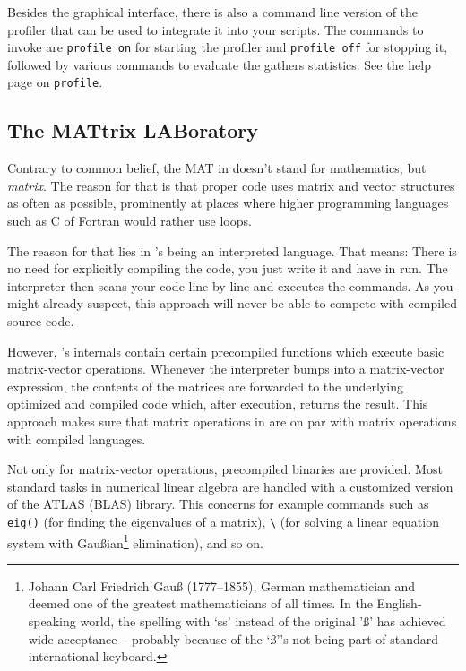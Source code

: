 \begin{remark}
Besides the graphical interface, there is also a command line version of the profiler that can be used to integrate it into your scripts. The commands to invoke are \lstinline!profile on! for starting the profiler and \lstinline!profile off! for stopping it, followed by various commands to evaluate the gathers statistics. See the \matlab{} help page on \lstinline!profile!.
\end{remark}


\subsection{The MATtrix LABoratory}

Contrary to common belief, the MAT in \matlab{} doesn't stand for mathematics, but \emph{matrix}. The reason for that is that proper \matlab{} code uses matrix and vector structures as often as possible, prominently at places where higher programming languages such as C of Fortran would rather use loops.

The reason for that lies in \matlab{}'s being an interpreted language. That means: There is no need for explicitly compiling the code, you just write it and have in run. The \matlab{} interpreter then scans your code line by line and executes the commands. As you might already suspect, this approach will never be able to compete with compiled source code.

However, \matlab{}'s internals contain certain precompiled functions which execute basic matrix-vector operations. Whenever the \matlab{} interpreter bumps into a matrix-vector expression, the contents of the matrices are forwarded to the underlying optimized and compiled code which, after execution, returns the result. This approach makes sure that matrix operations in \matlab{} are on par with matrix operations with compiled languages.

\begin{remark}
Not only for matrix-vector operations, precompiled binaries are provided. Most standard tasks in numerical linear algebra are handled with a customized version of the ATLAS (BLAS) library. This concerns for example commands such as \lstinline!eig()! (for finding the eigenvalues of a matrix), \lstinline!\! (for solving a linear equation system with Gau{\ss}ian\footnote{Johann Carl Friedrich Gau{\ss} (1777--1855), German mathematician and deemed one of the greatest mathematicians of all times. In the English-speaking world, the spelling with `ss' instead of the original '\ss' has achieved wide acceptance -- probably because of the `\ss''s not being part of standard international keyboard.} elimination), and so on.
\end{remark}

